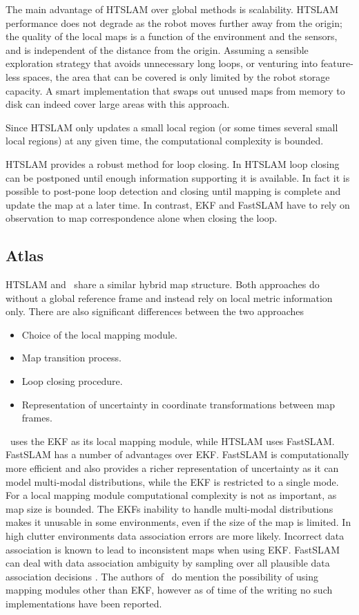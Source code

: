 The main advantage of HTSLAM over global methods is scalability. HTSLAM
performance does not degrade as the robot moves further away from the
origin; the quality of the local maps is a function of the environment
and the sensors, and is independent of the distance from the
origin. Assuming a sensible exploration strategy that avoids unnecessary
long loops, or venturing into feature-less spaces, the area that can be
covered is only limited by the robot storage capacity. A smart
implementation that swaps out unused maps from memory to disk can indeed
cover large areas with this approach.

Since HTSLAM only updates a small local region (or some times
several small local regions) at any given time, the computational
complexity is bounded.

HTSLAM provides a robust method for loop closing. In HTSLAM loop
closing can be postponed until enough information supporting it is
available. In fact it is possible to post-pone loop detection and
closing until mapping is complete and update the map at a later time. In
contrast, EKF and FastSLAM have to rely on observation to map
correspondence alone when closing the loop.


\subsection{Atlas}

HTSLAM and \Atlas\ share a similar hybrid map structure. Both approaches
do without a global reference frame and instead rely on local metric
information only. There are also significant differences between the
two approaches

\begin{itemize}
\item Choice of the local mapping module.
\item Map transition process.
\item Loop closing procedure.
\item Representation of uncertainty in coordinate transformations
  between map frames.
\end{itemize}

\Atlas\ uses the EKF as its local mapping module, while HTSLAM uses
FastSLAM. FastSLAM has a number of advantages over EKF. FastSLAM is
computationally more efficient and also provides a richer representation
of uncertainty as it can model multi-modal distributions, while the EKF
is restricted to a single mode. For a local mapping module computational
complexity is not as important, as map size is bounded. The EKFs
inability to handle multi-modal distributions makes it unusable in some
environments, even if the size of the map is limited.  In high clutter
environments data association errors are more likely. Incorrect data
association is known to lead to inconsistent maps when using
EKF. FastSLAM can deal with data association ambiguity by sampling over
all plausible data association decisions
\cite{fastslam,Montemerlo2003,nieto2003}. The authors of \Atlas\ do
mention the possibility of using mapping modules other than EKF, however
as of time of the writing no such implementations have been reported.


